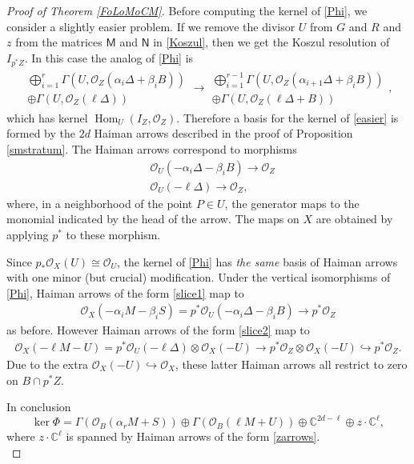 \documentclass{amsart}
\theoremstyle{definition}
\newcommand{\CC} {\mathbb{C}}          %
\renewcommand{\O}{\mathcal{O}}
\newcommand{\Hom}{\operatorname{Hom}}
\begin{document}
\begin{proof}[Proof of Theorem \ref{FoLoMoCM}]
Before computing the kernel of \eqref{Phi}, we consider a slightly easier problem. If we remove the divisor $U$ from $G$ and $R$ and $z$ from the matrices $\mathsf{M}$ and $\mathsf{N}$ in \eqref{Koszul}, then we get the Koszul resolution of $I_{p^*Z}$. In this case the analog of \eqref{Phi} is 
\begin{align} \label{easier}
\substack{\bigoplus_{i=1}^{r} \Gamma(U,\O_Z(\alpha_i \Delta + \beta_i B)) \\ \oplus \Gamma(U,\O_Z(\ell \Delta))} \longrightarrow \substack{\bigoplus_{i=1}^{r-1} \Gamma(U, \O_Z(\alpha_{i+1} \Delta + \beta_i B)) \\ \oplus \Gamma(U, \O_Z(\ell \Delta + B))},
\end{align}
which has kernel $\Hom_U(I_Z,\O_Z)$. Therefore a basis for the kernel of \eqref{easier} is formed by the $2d$ Haiman arrows described in the proof of Proposition \ref{smstratum}. The Haiman arrows correspond to morphisms 
\begin{align}
&\O_U(-\alpha_i \Delta - \beta_i B) \rightarrow \O_Z \label{slice1} \\
&\O_U(-\ell \Delta) \rightarrow \O_Z, \label{slice2}
\end{align}
where, in a neighborhood of the point $P \in U$, the generator maps to the monomial indicated by the head of the arrow. The maps on $X$ are obtained by applying $p^*$ to these morphism. 

Since $p_* \O_X(U) \cong \O_U$, the kernel of \eqref{Phi} has \emph{the same} basis of Haiman arrows with one minor (but crucial) modification. Under the vertical isomorphisms of \eqref{Phi}, Haiman arrows of the form \eqref{slice1} map to 
\begin{align*}
\O_X(-\alpha_i M - \beta_i S) = p^* \O_U(-\alpha_i \Delta - \beta_i B) \rightarrow p^* \O_Z 
\end{align*}
as before. However Haiman arrows of the form \eqref{slice2} map to
\begin{align} \label{zarrows}
\O_X(-\ell M - U) = p^* \O_U(-\ell \Delta) \otimes \O_X(-U) \rightarrow p^* \O_Z \otimes \O_X(-U) \hookrightarrow p^* \O_Z. 
\end{align}
Due to the extra $\O_X(-U) \hookrightarrow \O_X$, these latter Haiman arrows all restrict to zero on $B \cap p^*Z$. 

In conclusion
\begin{equation} \label{kerPhi}
\ker \Phi = \Gamma(\O_B(\alpha_r M + S)) \oplus \Gamma(\O_B(\ell M + U)) \oplus \CC^{2d - \ell} \oplus z \cdot \CC^{\ell},
\end{equation}
where $z \cdot \CC^{\ell}$ is spanned by Haiman arrows of the form \eqref{zarrows}. \\


\end{proof}
\end{document}
